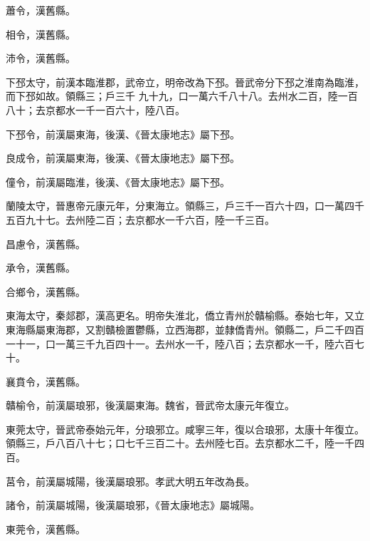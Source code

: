 \begin{pinyinscope}
 蕭令，漢舊縣。



 相令，漢舊縣。



 沛令，漢舊縣。



 下邳太守，前漢本臨淮郡，武帝立，明帝改為下邳。晉武帝分下邳之淮南為臨淮，而下邳如故。領縣三；戶三千
 九十九，口一萬六千八十八。去州水二百，陸一百八十；去京都水一千一百六十，陸八百。



 下邳令，前漢屬東海，後漢、《晉太康地志》屬下邳。



 良成令，前漢屬東海，後漢、《晉太康地志》屬下邳。



 僮令，前漢屬臨淮，後漢、《晉太康地志》屬下邳。



 蘭陵太守，晉惠帝元康元年，分東海立。領縣三，戶三千一百六十四，口一萬四千五百九十七。去州陸二百；去京都水一千六百，陸一千三百。



 昌慮令，漢舊縣。



 承令，漢舊縣。



 合鄉令，漢舊縣。



 東海太守，秦郯郡，漢高更名。明帝失淮北，僑立青州於贛榆縣。泰始七年，又立東海縣屬東海郡，又割贛檢置鬱縣，立西海郡，並隸僑青州。領縣二，戶二千四百一十一，口一萬三千九百四十一。去州水一千，陸八百；去京都水一千，陸六百七十。



 襄賁令，漢舊縣。



 贛榆令，前漢屬琅邪，後漢屬東海。魏省，晉武帝太康元年復立。



 東莞太守，晉武帝泰始元年，分琅邪立。咸寧三年，復以合琅邪，太康十年復立。領縣三，戶八百八十七；口七千三百二十。去州陸七百。去京都水二千，陸一千四百。



 莒令，前漢屬城陽，後漢屬琅邪。孝武大明五年改為長。



 諸令，前漢屬城陽，後漢屬琅邪，《晉太康地志》屬城陽。



 東莞令，漢舊縣。




\end{pinyinscope}
